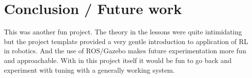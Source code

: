 \documentclass[10pt]{article}
\begin{document}
\section{Conclusion / Future work}
This was another fun project. The theory in the lessons were quite intimidating but the project template provided a very gentle introduction to application of RL in robotics. And the use of ROS/Gazebo makes future experimentation more fun and approachable. With in this project itself it would be fun to go back and experiment with tuning with a generally working system. 
\end{document}
